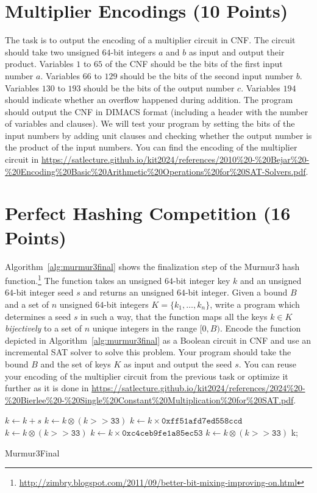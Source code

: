 \documentclass{article}
\begin{document}
\vspace*{-1em}

\section{Multiplier Encodings (10 Points)}

The task is to output the encoding of a multiplier circuit in CNF.
The circuit should take two unsigned $64$-bit integers $a$ and $b$ as input and output their product.
Variables $1$ to $65$ of the CNF should be the bits of the first input number $a$.
Variables $66$ to $129$ should be the bits of the second input number $b$.
Variables $130$ to $193$ should be the bits of the output number $c$.
Variables $194$ should indicate whether an overflow happened during addition.
The program should output the CNF in DIMACS format (including a header with the number of variables and clauses).
We will test your program by setting the bits of the input numbers by adding unit clauses and checking whether the output number is the product of the input numbers.
You can find the encoding of the multiplier circuit in \url{https://satlecture.github.io/kit2024/references/2010%20-%20Bejar%20-%20Encoding%20Basic%20Arithmetic%20Operations%20for%20SAT-Solvers.pdf}.

\section{Perfect Hashing Competition (16 Points)}

Algorithm~\ref{alg:murmur3final} shows the finalization step of the Murmur3 hash function.\footnote{\url{http://zimbry.blogspot.com/2011/09/better-bit-mixing-improving-on.html}}
The function takes an unsigned $64$-bit integer key $k$ and an unsigned $64$-bit integer seed $s$ and returns an unsigned $64$-bit integer.
Given a bound $B$ and a set of $n$ unsigned $64$-bit integers $K = \{k_1, \ldots, k_n\}$, write a program which determines a seed $s$ in such a way, that the function maps all the keys $k \in K$ \emph{bijectively} to a set of $n$ unique integers in the range $[0, B)$.
Encode the function depicted in Algorithm~\ref{alg:murmur3final} as a Boolean circuit in CNF and use an incremental SAT solver to solve this problem.
Your program should take the bound $B$ and the set of keys $K$ as input and output the seed $s$.
You can reuse your encoding of the multiplier circuit from the previous task or optimize it further as it is done in \url{https://satlecture.github.io/kit2024/references/2024%20-%20Bierlee%20-%20Single%20Constant%20Multiplication%20for%20SAT.pdf}.

\begin{algorithm}[H]
    \DontPrintSemicolon
    \BlankLine
    $k \leftarrow k + s$ \;
    $k \leftarrow k \otimes (k >> \mathtt{33})$ \;
    $k \leftarrow k \times \mathtt{0xff51afd7ed558ccd}$ \;
    $k \leftarrow k \otimes (k >> \mathtt{33})$ \;
    $k \leftarrow k \times \mathtt{0xc4ceb9fe1a85ec53}$ \;
    $k \leftarrow k \otimes  (k >> \mathtt{33})$ \;
    \BlankLine
    \Return k;
    \BlankLine
    \label{alg:murmur3final}
    \caption{Murmur3Final}
\end{algorithm}
\end{document}
